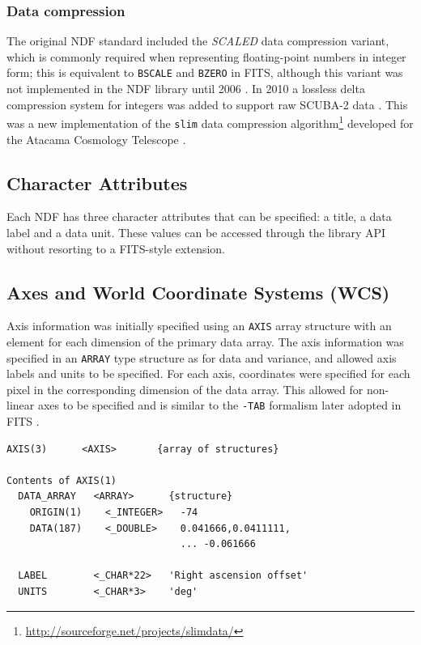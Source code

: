 \documentclass[final,authoryear,5p,times,twocolumn]{elsarticle}
\begin{document}
\subsubsection{Data compression}

The original NDF standard included the \emph{SCALED} data compression
variant, which is commonly required when representing floating-point numbers in
integer form; this is equivalent to \texttt{BSCALE} and \texttt{BZERO} in
FITS, although this variant was not implemented in the NDF library
until 2006 \citep{2008ASPC..394..650C}. In 2010 a lossless delta
compression system for integers was added to support raw SCUBA-2 data
\citep{2013MNRAS.430.2513H}. This was a new implementation of the
\texttt{slim} data compression
algorithm\footnote{\url{http://sourceforge.net/projects/slimdata/}}
developed for the Atacama Cosmology Telescope
\citep{2004SPIE.5498....1F}.

\subsection{Character Attributes}

Each NDF has three character attributes that can be specified: a
title, a data label and a data unit. These values can be accessed
through the library API without resorting to a FITS-style extension.

\subsection{Axes and World Coordinate Systems (WCS)}

Axis information was initially specified using an \texttt{AXIS} array
structure with an element for each dimension of the primary data
array. The axis information was specified in an \texttt{ARRAY} type
structure as for data and variance, and allowed axis labels and units
to be specified. For each axis, coordinates were specified for each
pixel in the corresponding dimension of the data array. This allowed
for non-linear axes to be specified and is similar to the
\texttt{-TAB} formalism later adopted in FITS \citep{2006A&A...446..747G}.

{\small
\begin{verbatim}
AXIS(3)      <AXIS>       {array of structures}

Contents of AXIS(1)
  DATA_ARRAY   <ARRAY>      {structure}
    ORIGIN(1)    <_INTEGER>   -74
    DATA(187)    <_DOUBLE>    0.041666,0.0411111,
                              ... -0.061666

  LABEL        <_CHAR*22>   'Right ascension offset'
  UNITS        <_CHAR*3>    'deg'
\end{verbatim}
}
\end{document}
